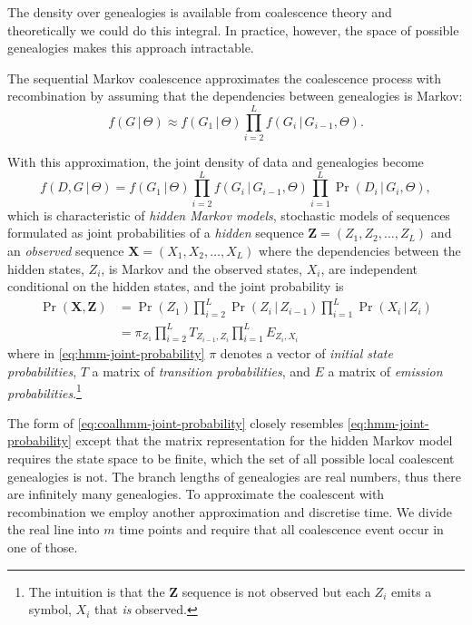 \documentclass[graybox]{svmult}
\newcommand{\G}{\ensuremath{G}}
\renewcommand{\D}{\ensuremath{D}}
\newcommand{\T}{\ensuremath{T}}
\renewcommand{\E}{\ensuremath{E}}
\begin{document}
The density over genealogies is available from coalescence theory and theoretically we could do this integral. In practice, however, the space of possible genealogies makes this approach intractable.

The sequential Markov coalescence approximates the coalescence process with recombination by assuming that the dependencies between genealogies is Markov:
\begin{equation}
  \label{eq:markov-genealogy}
  f(\G\,|\,\Theta) \approx
  f(\G_1\,|\,\Theta)\prod_{i=2}^{L}f(\G_{i}\,|\,\G_{i-1},\Theta)
  .
\end{equation}

With this approximation, the joint density of data and genealogies become
\begin{equation}
  \label{eq:coalhmm-joint-probability}
  f(\D,\G\,|\,\Theta) = 
  	f(\G_1\,|\,\Theta)
  	\prod_{i=2}^{L}f(\G_{i}\,|\,\G_{i-1},\Theta)
  	\prod_{i=1}^L \Pr(\D_i\,|\,\G_i,\Theta)
  	,
\end{equation}
which is characteristic of \emph{hidden Markov models}, stochastic models of sequences formulated as joint probabilities of a \emph{hidden} sequence $\mathbf{Z}=(Z_1,Z_2,\ldots,Z_L)$ and an \emph{observed} sequence $\mathbf{X}=(X_1,X_2,\ldots,X_L)$ where the dependencies between the hidden states, $Z_i$, is Markov and the observed states, $X_i$, are independent conditional on the hidden states, and the joint probability is
\begin{align}
  \Pr(\mathbf{X},\mathbf{Z})
    &= 
  	\Pr(Z_1)
  	\prod_{i=2}^{L}\Pr(Z_{i}\,|\,Z_{i-1})
  	\prod_{i=1}^L \Pr(X_i\,|\,Z_i)
  	\\
    \label{eq:hmm-joint-probability}
  	&=
  	\pi_{Z_1}
  	\prod_{i=2}^{L}\T_{Z_{i-1},Z_{i}}
  	\prod_{i=1}^L  \E_{Z_i,X_i}
\end{align}
where in \eqref{eq:hmm-joint-probability} $\pi$ denotes a vector of \emph{initial state probabilities}, $\T$ a matrix of \emph{transition probabilities}, and $\E$ a matrix of \emph{emission probabilities}.\footnote{The intuition is that the $\mathbf{Z}$ sequence is not observed but each $Z_i$ emits a symbol, $X_i$ that \emph{is} observed.}

The form of \eqref{eq:coalhmm-joint-probability} closely resembles \eqref{eq:hmm-joint-probability} except that the matrix representation for the hidden Markov model requires the state space to be finite, which the set of all possible local coalescent genealogies is not. The branch lengths of genealogies are real numbers, thus there are infinitely many genealogies. To approximate the coalescent with recombination we employ another approximation and discretise time. We divide the real line into $m$ time points and require that all coalescence event occur in one of those.
\end{document}
